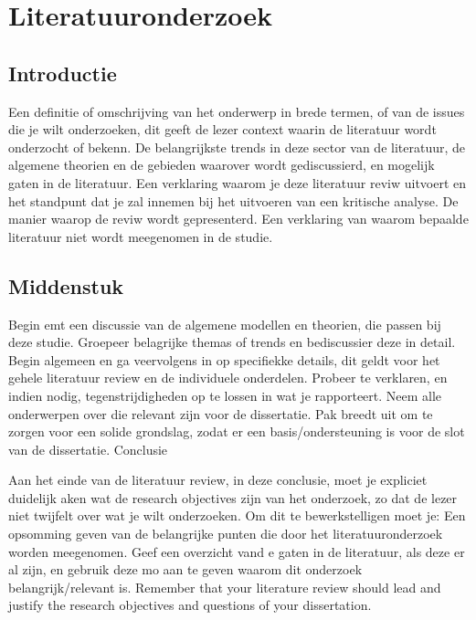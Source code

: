 \newpage

\section{Literatuuronderzoek}


 


\subsection{Introductie}


 

Een definitie of omschrijving van het onderwerp in brede termen, of van de issues die je wilt onderzoeken, dit geeft de lezer context waarin de literatuur wordt onderzocht of bekenn. De belangrijkste trends in deze sector van de literatuur, de algemene theorien en de gebieden waarover wordt gediscussierd, en mogelijk gaten in de literatuur.
Een verklaring waarom je deze literatuur reviw uitvoert en het standpunt dat je zal innemen bij het uitvoeren van een kritische analyse.
De manier waarop de reviw wordt gepresenterd.
Een verklaring  van waarom bepaalde literatuur niet wordt meegenomen in de studie.
\subsection{Middenstuk}

 
 
Begin emt een discussie van de algemene modellen en theorien, die passen bij deze studie. Groepeer belagrijke themas of trends en bediscussier deze in detail. Begin algemeen en ga veervolgens in op specifiekke details, dit geldt voor het gehele literatuur review en de individuele onderdelen.
Probeer te verklaren, en indien nodig, tegenstrijdigheden  op te lossen in wat je rapporteert. Neem alle onderwerpen over die relevant zijn voor de dissertatie.
Pak breedt uit om te zorgen voor een solide grondslag, zodat er een basis/ondersteuning is voor de slot van de dissertatie.
Conclusie
 

Aan het einde van de literatuur review, in deze conclusie, moet je expliciet duidelijk aken wat de research objectives zijn  van het onderzoek, zo dat de lezer niet twijfelt over wat je wilt onderzoeken.
Om dit te bewerkstelligen moet je:
Een opsomming geven van de belangrijke punten die door het literatuuronderzoek worden meegenomen.
Geef een overzicht vand e gaten in de literatuur, als deze er al zijn, en gebruik deze mo aan te geven waarom dit onderzoek belangrijk/relevant is.
Remember  that  your  literature  review  should  lead  and  justify  the research objectives and questions of your dissertation.

